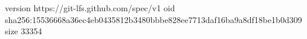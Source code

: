 version https://git-lfs.github.com/spec/v1
oid sha256:15536668a36ec4eb0435812b3480bbbe828ee7713daf16ba9a8df18be1b0d309
size 33354
